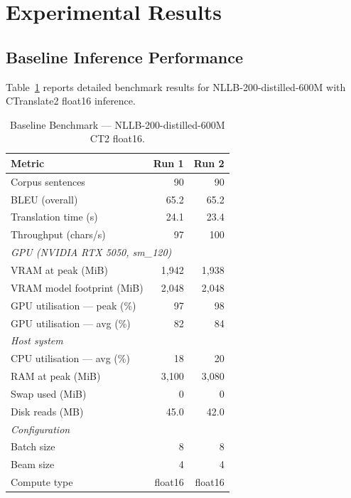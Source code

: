\documentclass[conference]{IEEEtran}
\begin{document}
\section{Experimental Results}

\subsection{Baseline Inference Performance}

Table~\ref{tab:benchmark} reports detailed benchmark results for
NLLB-200-distilled-600M with CTranslate2 float16 inference.

\begin{table}[htbp]
\caption{Baseline Benchmark --- NLLB-200-distilled-600M CT2 float16.}
\label{tab:benchmark}
\centering
\begin{tabular}{lrr}
\toprule
Metric & Run 1 & Run 2 \\
\midrule
Corpus sentences & 90 & 90 \\
BLEU (overall) & 65.2 & 65.2 \\
Translation time (s) & 24.1 & 23.4 \\
Throughput (chars/s) & 97 & 100 \\
\midrule
\multicolumn{3}{l}{\textit{GPU (NVIDIA RTX 5050, sm\_120)}} \\
VRAM at peak (MiB) & 1{,}942 & 1{,}938 \\
VRAM model footprint (MiB) & 2{,}048 & 2{,}048 \\
GPU utilisation --- peak (\%) & 97 & 98 \\
GPU utilisation --- avg (\%) & 82 & 84 \\
\midrule
\multicolumn{3}{l}{\textit{Host system}} \\
CPU utilisation --- avg (\%) & 18 & 20 \\
RAM at peak (MiB) & 3{,}100 & 3{,}080 \\
Swap used (MiB) & 0 & 0 \\
Disk reads (MB) & 45.0 & 42.0 \\
\midrule
\multicolumn{3}{l}{\textit{Configuration}} \\
Batch size & 8 & 8 \\
Beam size & 4 & 4 \\
Compute type & float16 & float16 \\
\bottomrule
\end{tabular}
\end{table}
\end{document}
